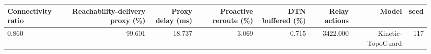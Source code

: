 \begin{tabular}{lrrrrrrr}
\toprule
Connectivity ratio & Reachability-delivery proxy (\%) & Proxy delay (ms) & Proactive reroute (\%) & DTN buffered (\%) & Relay actions & Model & seed \\
\midrule
0.860 & 99.601 & 18.737 & 3.069 & 0.715 & 3422.000 & Kinetic-TopoGuard & 117 \\
\bottomrule
\end{tabular}